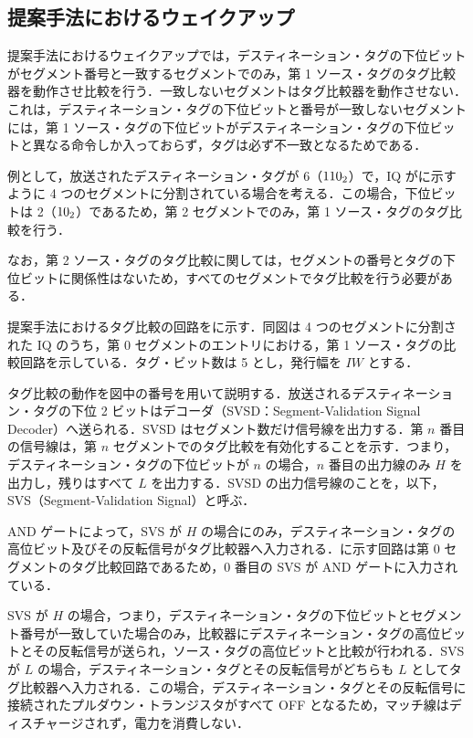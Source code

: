 \subsection{提案手法におけるウェイクアップ}
提案手法におけるウェイクアップでは，デスティネーション・タグの下位ビットがセグメント番号と一致するセグメントでのみ，第 1 ソース・タグのタグ比較器を動作させ比較を行う．一致しないセグメントはタグ比較器を動作させない．これは，デスティネーション・タグの下位ビットと番号が一致しないセグメントには，第 1 ソース・タグの下位ビットがデスティネーション・タグの下位ビットと異なる命令しか入っておらず，タグは必ず不一致となるためである．

例として，放送されたデスティネーション・タグが 6（${\rm 110_2}$）で，IQ がに示すように 4 つのセグメントに分割されている場合を考える．この場合，下位ビットは 2（${\rm 10_2}$）であるため，第 2 セグメントでのみ，第 1 ソース・タグのタグ比較を行う．

なお，第 2 ソース・タグのタグ比較に関しては，セグメントの番号とタグの下位ビットに関係性はないため，すべてのセグメントでタグ比較を行う必要がある．

提案手法におけるタグ比較の回路をに示す．同図は 4 つのセグメントに分割された IQ のうち，第 0 セグメントのエントリにおける，第 1 ソース・タグの比較回路を示している．タグ・ビット数は 5 とし，発行幅を $IW$ とする．

タグ比較の動作を図中の番号を用いて説明する．放送されるデスティネーション・タグの下位 2 ビットはデコーダ（SVSD：Segment-Validation Signal Decoder）へ送られる．SVSD はセグメント数だけ信号線を出力する．第 $n$ 番目の信号線は，第 $n$ セグメントでのタグ比較を有効化することを示す．つまり，デスティネーション・タグの下位ビットが $n$ の場合，$n$ 番目の出力線のみ $H$ を出力し，残りはすべて $L$ を出力する．SVSD の出力信号線のことを，以下， SVS（Segment-Validation Signal）と呼ぶ．

AND ゲートによって，SVS が $H$ の場合にのみ，デスティネーション・タグの高位ビット及びその反転信号がタグ比較器へ入力される．に示す回路は第 0 セグメントのタグ比較回路であるため，0 番目の SVS が AND ゲートに入力されている．

SVS が $H$ の場合，つまり，デスティネーション・タグの下位ビットとセグメント番号が一致していた場合のみ，比較器にデスティネーション・タグの高位ビットとその反転信号が送られ，ソース・タグの高位ビットと比較が行われる．SVS が $L$ の場合，デスティネーション・タグとその反転信号がどちらも $L$ としてタグ比較器へ入力される．この場合，デスティネーション・タグとその反転信号に接続されたプルダウン・トランジスタがすべて OFF となるため，マッチ線はディスチャージされず，電力を消費しない．

